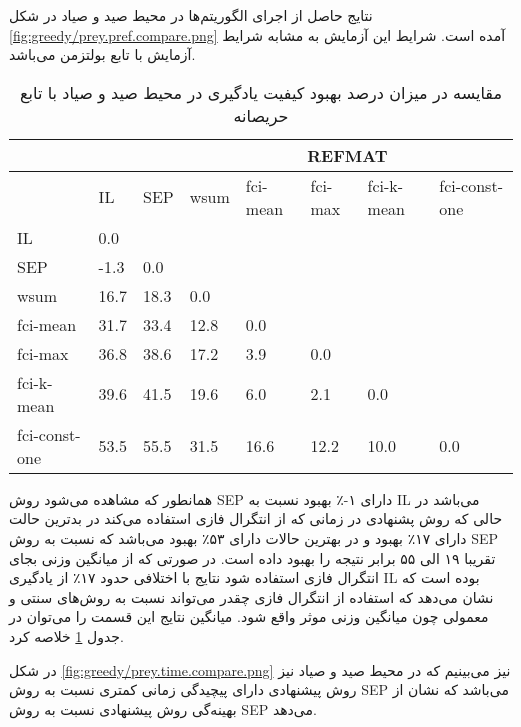  نتایج حاصل از اجرای الگوریتم‌ها در محیط صید و صیاد در شکل
\ref{fig:greedy/prey.pref.compare.png}
آمده است. شرایط این آزمایش به مشابه شرایط آزمایش با تابع بولتزمن می‌باشد.


\begin{table}[h!]
\centering
\caption{مقایسه در میزان درصد بهبود کیفیت یادگیری در محیط صید و صیاد با تابع حریصانه}\label{tab:prey_pref_compare_greedy}
\begin{latin}
\begin{tabular}{|*8{l|}}
\hline
\multicolumn{3}{|c|}{}& \multicolumn{5}{c|}{REFMAT}
\\\hline
& IL & SEP & wsum & fci-mean & fci-max & fci-k-mean & fci-const-one
\\\hline
IL &0.0 & & & & & &
\\\hline
SEP &-1.3 &0.0 & & & & &
\\\hline
wsum &16.7 &18.3 &0.0 & & & &
\\\hline
fci-mean &31.7 &33.4 &12.8 &0.0 & & &
\\\hline
fci-max &36.8 &38.6 &17.2 &3.9 &0.0 & &
\\\hline
fci-k-mean &39.6 &41.5 &19.6 &6.0 &2.1 &0.0 &
\\\hline
fci-const-one &53.5 &55.5 &31.5 &16.6 &12.2 &10.0 &0.0
\\\hline
\end{tabular}
\end{latin}
\end{table}

همانطور که مشاهده می‌شود روش SEP دارای ۱-٪ بهبود نسبت به IL می‌باشد در حالی که روش پشنهادی در زمانی که از انتگرال فازی استفاده می‌کند در بدترین حالت دارای ۱۷٪ بهبود و در بهترین حالات دارای ۵۳٪ بهبود می‌باشد که نسبت به روش SEP تقریبا ۱۹ الی ۵۵ برابر نتیجه را بهبود داده است. در صورتی که از میانگین وزنی بجای انتگرال فازی استفاده شود نتایج با اختلافی حدود ۱۷٪  از یادگیری IL بوده است که نشان ‌می‌دهد که استفاده از انتگرال فازی چقدر می‌تواند نسبت به روش‌های سنتی و معمولی چون میانگین وزنی موثر واقع شود. میانگین نتایج این قسمت را می‌توان در جدول
\ref{tab:prey_pref_compare_greedy}
خلاصه کرد.

 در شکل
\ref{fig:greedy/prey.time.compare.png}
نیز می‌بینیم که در محیط صید و صیاد نیز روش پیشنهادی دارای پیچیدگی زمانی کمتری نسبت به روش SEP می‌باشد که نشان از بهینه‌گی روش پیشنهادی نسبت به روش SEP می‌دهد.

